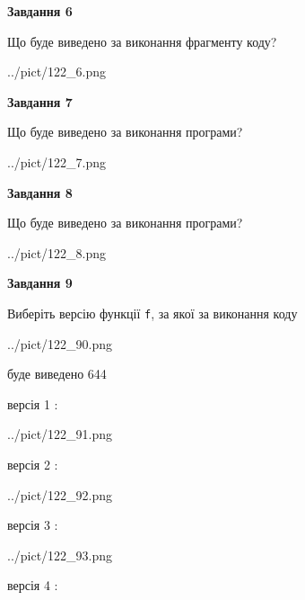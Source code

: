 \documentclass[12pt, ukrainian]{article}
\def\code#1{\Verb!#1!}
\begin{document}
{\begin {large}
{\begin {center}\textbf{Завдання 6}\end {center}}

Що буде виведено за виконання фрагменту коду?\par
\begin{center}
	{../pict/122_6.png}
\end{center}
\newpage

{\begin {center}\textbf{Завдання 7}\end {center}}

Що буде виведено за виконання програми?\par
\begin{center}
	{../pict/122_7.png}
\end{center}
\newpage

{\begin {center}\textbf{Завдання 8}\end {center}}

Що буде виведено за виконання програми?\par
\begin{center}
	{../pict/122_8.png}
\end{center}
\newpage

{\begin {center}\textbf{Завдання 9}\end {center}}

Виберіть версію функції \code{f}, за якої за виконання коду
\begin{center}
	{../pict/122_90.png}
\end{center}
буде виведено 644

\vspace{5mm}
версія 1 :

\begin{center}
	{../pict/122_91.png}
\end{center}
версія 2 :

\begin{center}
	{../pict/122_92.png}
\end{center}
версія 3 :

\begin{center}
	{../pict/122_93.png}
\end{center}
версія 4 :


\end{large}}
\end{document}
